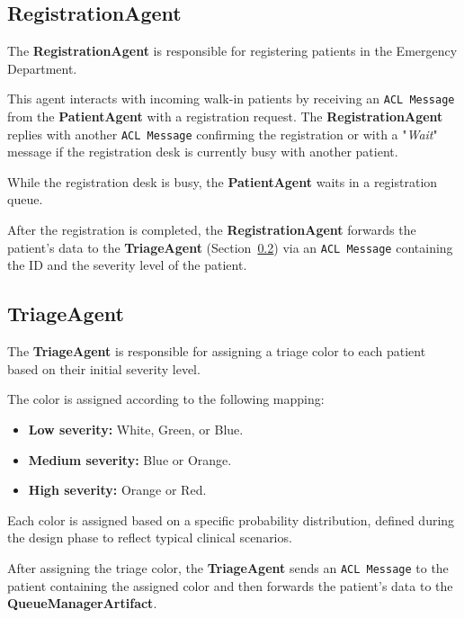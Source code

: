 \documentclass{article}[12pt]
\begin{document}
\subsection{RegistrationAgent}
\label{subsec:registration-agent}

\noindent
The \textbf{RegistrationAgent} is responsible for registering patients in the Emergency Department. 

\noindent
This agent interacts with incoming walk-in patients by receiving an \texttt{ACL Message} from the \textbf{PatientAgent} with a registration request. The \textbf{RegistrationAgent} replies with another \texttt{ACL Message} confirming the registration or with a "\textit{Wait}" message if the registration desk is currently busy with another patient.

\noindent
While the registration desk is busy, the \textbf{PatientAgent} waits in a registration queue.

\noindent
After the registration is completed, the \textbf{RegistrationAgent} forwards the patient's data to the \textbf{TriageAgent} (Section~\ref{subsec:triage-agent}) via an \texttt{ACL Message} containing the ID and the severity level of the patient.

\subsection{TriageAgent}
\label{subsec:triage-agent}

\noindent
The \textbf{TriageAgent} is responsible for assigning a triage color to each patient based on their initial severity level.

\noindent
The color is assigned according to the following mapping:
\begin{itemize}
    \item \textbf{Low severity:} White, Green, or Blue.
    \item \textbf{Medium severity:} Blue or Orange.
    \item \textbf{High severity:} Orange or Red.
\end{itemize}

\noindent
Each color is assigned based on a specific probability distribution, defined during the design phase to reflect typical clinical scenarios.

\noindent
After assigning the triage color, the \textbf{TriageAgent} sends an \texttt{ACL Message} to the patient containing the assigned color and then forwards the patient's data to the \textbf{QueueManagerArtifact}. 
\end{document}
